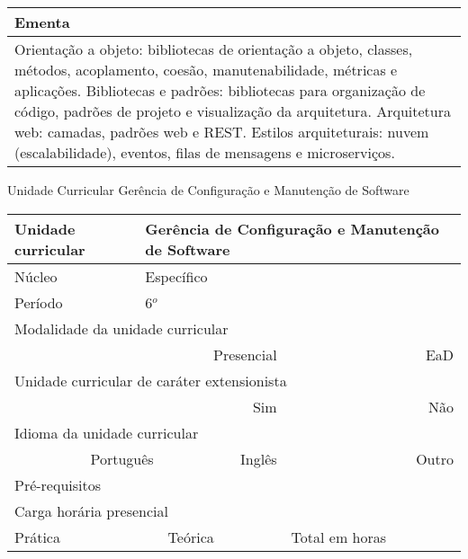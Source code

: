 \begin{quadro}[ht!]
\begin{tabular}{|p{3cm} p{2cm} p{3cm} p{2cm} p{3cm} p{2cm}|}
\multicolumn{6}{|p{15cm}|}{\cellcolor{blue1} Ementa} \\\hline
\hline\multicolumn{6}{|p{15cm}|}{\scriptsize Orientação a objeto: bibliotecas de orientação a objeto, classes, métodos, acoplamento, coesão, manutenabilidade, métricas e aplicações. Bibliotecas e padrões: bibliotecas para organização de código, padrões de projeto e visualização da arquitetura. Arquitetura web: camadas, padrões web e REST. Estilos arquiteturais: nuvem (escalabilidade), eventos, filas de mensagens e microserviços. }\\\hline 
\hline
	\end{tabular}
\end{quadro}


\begin{quadro}[ht!]
  \centering\scriptsize
\caption{Unidade Curricular Gerência de Configuração e Manutenção de Software}
\label{unit_29}
\begin{tabular}{|p{3cm} p{2cm} p{3cm} p{2cm} p{3cm} p{2cm}|}\hline
\multicolumn{1}{|p{3cm}|}{\cellcolor{blue1} Unidade curricular} & \multicolumn{5}{p{9cm}|}{Gerência de Configuração e Manutenção de Software}\\\hline
\multicolumn{1}{|p{3cm}|}{\cellcolor{blue1} Núcleo} & \multicolumn{5}{p{11.5cm}|}{Específico}\\\hline
\multicolumn{1}{|p{3cm}|}{\cellcolor{blue1} Período} & \multicolumn{5}{p{9cm}|}{6$^o$}\\\hline
\multicolumn{6}{|p{15cm}|}{\cellcolor{blue1} Modalidade da unidade curricular} \\\hline
\multicolumn{2}{|r}{		} &  \multicolumn{2}{r}{Presencial \XBox} & \multicolumn{2}{r|}{EaD \Square	} \\\hline
\multicolumn{6}{|p{15cm}|}{\cellcolor{blue1} Unidade curricular de caráter extensionista} \\\hline
\multicolumn{4}{|r}{			Sim \Square	} & \multicolumn{2}{r|}{	Não \XBox	}\\\hline
\multicolumn{6}{|p{15cm}|}{\cellcolor{blue1} Idioma da unidade curricular} \\ \hline
\multicolumn{2}{|r}{	Português \XBox	} &  \multicolumn{2}{r}{	Inglês \Square	} & \multicolumn{2}{r|}{	Outro \Square	} \\ \hline
\multicolumn{1}{|p{3cm}|}{\cellcolor{blue1} Pré-requisitos} & \multicolumn{5}{p{9cm}|}{}\\ \hline
\multicolumn{6}{|p{15cm}|}{\cellcolor{blue1} Carga horária presencial} \\ \hline
\multicolumn{1}{|p{3cm}|}{\raggedleft Prática} & \multicolumn{1}{p{1cm}|}{\centering	30	} &  \multicolumn{1}{p{3cm}|}{\raggedleft Teórica}  & \multicolumn{1}{p{1cm}|}{\centering 	30	} & \multicolumn{1}{p{3cm}|}{\raggedleft Total em horas} & \multicolumn{1}{p{1cm}|}{\raggedleft	60	} \\ \hline 

\end{tabular}
\end{quadro}
